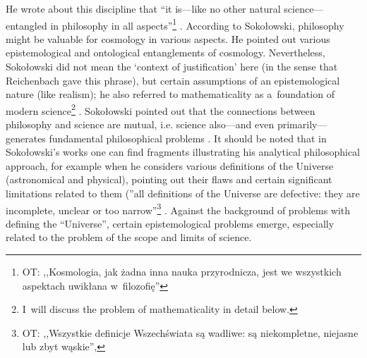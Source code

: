He wrote about this discipline that ``it is---like no other natural science---entangled in philosophy in all aspects''\footnote{OT: ,,Kosmologia, jak żadna inna nauka przyrodnicza, jest we wszystkich aspektach uwikłana w~filozofię''} 
\parencite[][p.226]{}. %
 According to Sokołowski, philosophy might be valuable for cosmology in various aspects. He pointed out various epistemological and ontological entanglements of cosmology. Nevertheless, Sokołowski did not mean the ‘context of justification' here (in the sense that Reichenbach gave this phrase), but certain assumptions of an epistemological nature (like realism); he also referred to mathematicality as a~foundation of modern science\footnote{I~will discuss the problem of mathematicality in detail below. } 
\parencite[][p.181]{}. %
 Sokołowski pointed out that the connections between philosophy and science are mutual, i.e. science also---and even primarily---generates fundamental philosophical problems 
\parencite[][p.56]{}. %
 It should be noted that in Sokołowski's works one can find fragments illustrating his analytical philosophical approach, for example when he considers various definitions of the Universe (astronomical and physical), pointing out their flaws and certain significant limitations related to them (''all definitions of the Universe are defective: they are incomplete, unclear or too narrow''\footnote{OT: ,,Wszystkie definicje Wszechświata są wadliwe: są niekompletne, niejasne lub zbyt wąskie'',} 
\parencite[][p.235]{}. %
 Against the background of problems with defining the ``Universe'', certain epistemological problems emerge, especially related to the problem of the scope and limits of science.



